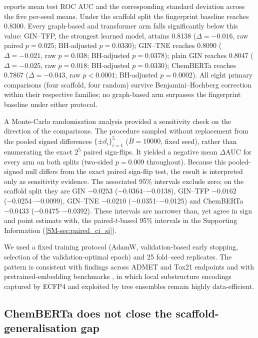 \documentclass[11pt,a4paper]{article}
\begin{document}
 reports mean test ROC AUC and the corresponding standard deviation across the five per-seed means. Under the scaffold split the fingerprint baseline reaches \num{0.8300}. Every graph-based and transformer arm falls significantly below this value: GIN--TFP, the strongest learned model, attains \num{0.8138} ($\Delta = -\num{0.016}$, raw paired $p = \num{0.025}$; BH-adjusted $p = \num{0.0330}$); GIN--TNE reaches \num{0.8090} ($\Delta = -\num{0.021}$, raw $p = \num{0.038}$; BH-adjusted $p = \num{0.0378}$); plain GIN reaches \num{0.8047} ($\Delta = -\num{0.025}$, raw $p = \num{0.018}$; BH-adjusted $p = \num{0.0330}$); ChemBERTa reaches \num{0.7867} ($\Delta = -\num{0.043}$, raw $p < \num{0.0001}$; BH-adjusted $p = \num{0.0002}$). All eight primary comparisons (four scaffold, four random) survive Benjamini--Hochberg correction within their respective families; no graph-based arm surpasses the fingerprint baseline under either protocol.

A Monte-Carlo randomisation analysis provided a sensitivity check on the direction of the comparisons. The procedure sampled without replacement from the pooled signed differences $\{\pm d_i\}_{i=1}^{5}$ ($B=\num{10000}$, fixed seed), rather than enumerating the exact $2^5$ paired sign-flips. It yielded a negative mean $\Delta$AUC for every arm on both splits (two-sided $p=\num{0.009}$ throughout). Because this pooled-signed null differs from the exact paired sign-flip test, the result is interpreted only as sensitivity evidence. The associated 95\% intervals exclude zero; on the scaffold split they are GIN $-\num{0.0253}$ (\numrange{-0.0364}{-0.0138}), GIN--TFP $-\num{0.0162}$ (\numrange{-0.0254}{-0.0099}), GIN--TNE $-\num{0.0210}$ (\numrange{-0.0351}{-0.0125}) and ChemBERTa $-\num{0.0433}$ (\numrange{-0.0475}{-0.0392}). These intervals are narrower than, yet agree in sign and point estimate with, the paired-$t$-based 95\% intervals in the Supporting Information (\cref{SM-sec:paired_ci_si}).

We used a fixed training protocol (AdamW, validation-based early stopping, selection of the validation-optimal epoch) and \num{25} fold--seed replicates. The pattern is consistent with findings across ADMET and Tox21 endpoints \citep{guo_ding_2026} and with pretrained-embedding benchmarks \citep{benchmark_pretrained_2025}, in which local substructure encodings captured by ECFP4 and exploited by tree ensembles remain highly data-efficient.

\subsection{ChemBERTa does not close the scaffold-generalisation gap}
\end{document}
